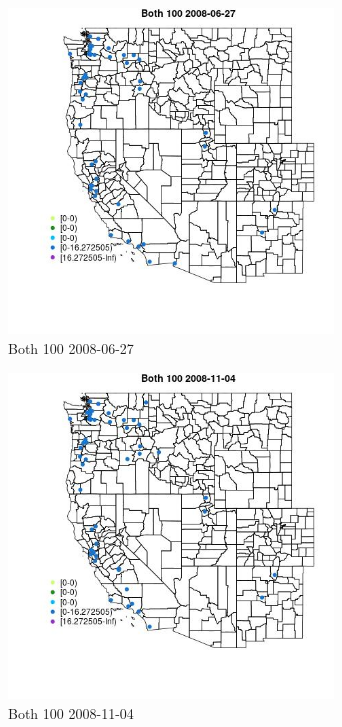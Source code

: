 \begin{figure} 
\centering  
\includegraphics[width=0.77\textwidth]{Code_Outputs/Report_ML_input_PM25_Step4_part_e_de_duplicated_aves_MapObsBoth_1002008-06-27.jpg} 
\caption{\label{fig:Report_ML_input_PM25_Step4_part_e_de_duplicated_avesMapObsBoth_1002008-06-27}Both 100 2008-06-27} 
\end{figure} 
 

\begin{figure} 
\centering  
\includegraphics[width=0.77\textwidth]{Code_Outputs/Report_ML_input_PM25_Step4_part_e_de_duplicated_aves_MapObsBoth_1002008-11-04.jpg} 
\caption{\label{fig:Report_ML_input_PM25_Step4_part_e_de_duplicated_avesMapObsBoth_1002008-11-04}Both 100 2008-11-04} 
\end{figure} 
 

